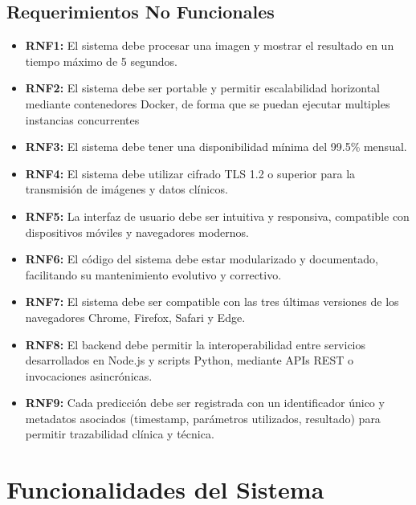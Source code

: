 \subsection{Requerimientos No Funcionales}
\label{ssc:RNF}

\begin{itemize}
    \item \textbf{RNF1:} El sistema debe procesar una imagen y mostrar el resultado en un tiempo máximo de 5 segundos.
    
    \item \textbf{RNF2:} El sistema debe ser portable y permitir escalabilidad horizontal mediante contenedores Docker, de forma que se puedan ejecutar multiples instancias concurrentes
    
    \item \textbf{RNF3:} El sistema debe tener una disponibilidad mínima del 99.5\% mensual.
    
    \item \textbf{RNF4:} El sistema debe utilizar cifrado TLS 1.2 o superior para la transmisión de imágenes y datos clínicos.
    
    \item \textbf{RNF5:} La interfaz de usuario debe ser intuitiva y responsiva, compatible con dispositivos móviles y navegadores modernos.
    
    \item \textbf{RNF6:} El código del sistema debe estar modularizado y documentado, facilitando su mantenimiento evolutivo y correctivo.
    
    \item \textbf{RNF7:} El sistema debe ser compatible con las tres últimas versiones de los navegadores Chrome, Firefox, Safari y Edge.
    
    \item \textbf{RNF8:} El backend debe permitir la interoperabilidad entre servicios desarrollados en Node.js y scripts Python, mediante APIs REST o invocaciones asincrónicas.
    
    \item \textbf{RNF9:} Cada predicción debe ser registrada con un identificador único y metadatos asociados (timestamp, parámetros utilizados, resultado) para permitir trazabilidad clínica y técnica.
\end{itemize}


\section{Funcionalidades del Sistema}
\label{sc:FS}


